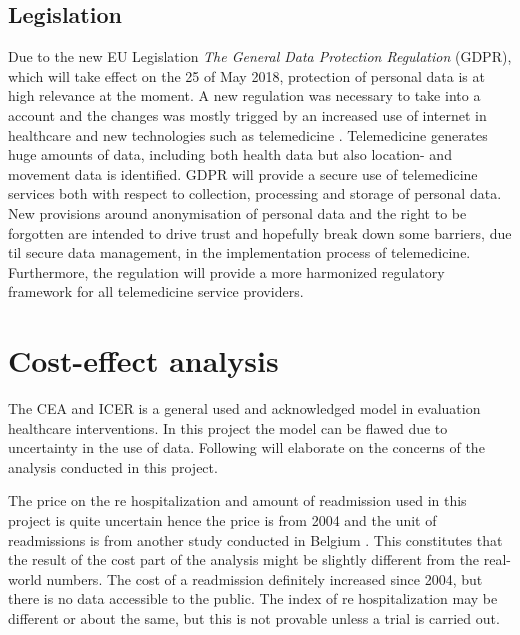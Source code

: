  

\subsection{Legislation} 
Due to the new EU Legislation \textit{The General Data Protection Regulation} (GDPR), which will take effect on the 25 of May 2018, protection of personal data is at high relevance at the moment. A new regulation was necessary to take into a account and the changes was mostly trigged by an increased use of internet in healthcare and new technologies such as telemedicine \cite{GDPR}. Telemedicine generates huge amounts of data, including both health data but also location- and movement data is identified. GDPR will provide a secure use of telemedicine services both with respect to collection, processing and storage of personal data. New provisions around anonymisation of personal data and the right to be forgotten are intended to drive trust and hopefully break down some barriers, due til secure data management, in the implementation process of telemedicine. Furthermore, the regulation will provide a more harmonized regulatory framework for all telemedicine service providers.   




 


\section{Cost-effect analysis}

The CEA and ICER is a general used and acknowledged model in evaluation healthcare interventions. In this project the model can be flawed due to uncertainty in the use of data.  Following will elaborate on the concerns of the analysis conducted in this project. 

The price on the re hospitalization and amount of readmission used in this project is quite uncertain hence the price is from 2004 and the unit of readmissions is from another study conducted in Belgium \cite{costeffect, rasmussen2011hjerterehabilitering}. This constitutes that the result of the cost part of the analysis might be slightly different from the real-world numbers. The cost of a readmission definitely increased since 2004, but there is no data accessible to the public. The index of re hospitalization may be different or about the same, but this is not provable unless a trial is carried out. 

